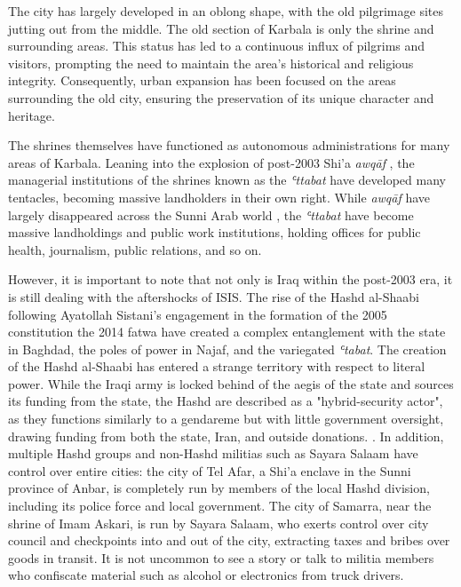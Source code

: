 The city has largely developed in an oblong shape, with the old pilgrimage sites jutting out from the middle. The old section of Karbala is only the shrine and surrounding areas. This status has led to a continuous influx of pilgrims and visitors, prompting the need to maintain the area's historical and religious integrity. Consequently, urban expansion has been focused on the areas surrounding the old city, ensuring the preservation of its unique character and heritage.

The shrines themselves have functioned as autonomous administrations for many areas of Karbala. Leaning into the explosion of post-2003 Shi'a \emph{awqāf} \cite{hamdan_development_2012}, the managerial institutions of the shrines known as the \emph{ʿttabat}  have developed many tentacles, becoming massive landholders in their own right. While \emph{awqāf} have largely disappeared across the Sunni Arab world \cite{moumtaz_gods_2021}, the \emph{ʿttabat}  have become massive landholdings and public work institutions, holding offices for public health, journalism, public relations, and so on. 

However, it is important to note that not only is Iraq within the post-2003 era, it is still dealing with the aftershocks of ISIS. The rise of the Hashd al-Shaabi following Ayatollah Sistani's engagement in the formation of the 2005 constitution \cite{al-rahim_sistani_2005} the 2014 fatwa \cite{rudolf_battlefield_2018}\cite{ann_wainscott_engaging_2019} have created a complex entanglement with the state in Baghdad, the poles of power in Najaf, and the variegated \emph{ʿtabat}. The creation of the Hashd al-Shaabi has entered a strange territory with respect to literal power. While the Iraqi army is locked behind of the aegis of the state and sources its funding from the state, the Hashd are described as a "hybrid-security actor", as they functions similarly to a gendareme but with little government oversight, drawing funding from both the state, Iran, and outside donations.\cite{cambanis_hybrid_2019} \cite{renad_mansour_popular_2018}. In addition, multiple Hashd groups and non-Hashd militias such as Sayara Salaam have control over entire cities: the city of Tel Afar, a Shi'a enclave in the Sunni province of Anbar, is completely run by members of the local Hashd division, including its police force and local government. The city of Samarra, near the shrine of Imam Askari, is run by Sayara Salaam, who exerts control over city council and checkpoints into and out of the city, extracting taxes and bribes over goods in transit. It is not uncommon to see a story or talk to militia members who confiscate material such as alcohol or electronics from truck drivers. 

